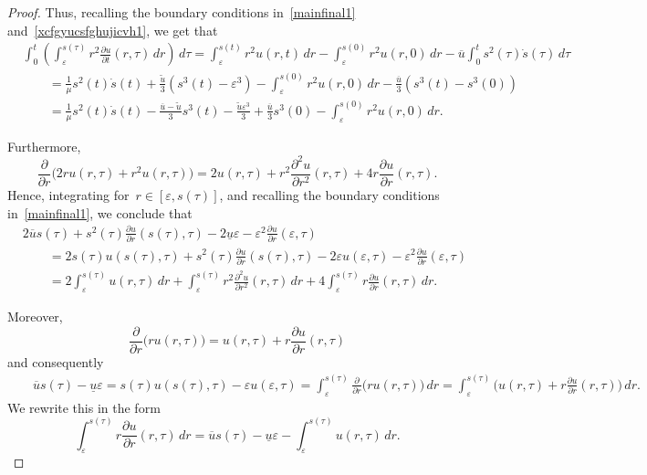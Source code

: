 \documentclass[12pt,a4paper,intlimits,sumlimits]{amsart}
\theoremstyle{definition}
\theoremstyle{plain}
\numberwithin{equation}{section}
\begin{document}
\begin{proof}
Thus, recalling the boundary conditions in~\eqref{mainfinal1} and~\eqref{xcfgyucsfghujicvh1}, we get that
\begin{equation}\label{xcfgyucsfghujicvh2}
\begin{aligned}&
\int_0^t\left(\int_\varepsilon^{s(\tau)}r^2\frac{\partial u}{\partial t}(r,\tau)\, dr\right)\,d\tau=\int_\varepsilon^{s(t)}r^2u(r,t)\,dr-\int_\varepsilon^{s(0)}r^2u(r,0)\,dr-\overline{u}\int_0^ts^2(\tau)\dot s(\tau)\,d\tau \\
&\qquad=\frac{1}{\mu}s^2(t)\dot s(t)+\frac{\widetilde u}{3}(s^3(t)-\varepsilon^3)-\int_\varepsilon^{s(0)}r^2u(r,0)\,dr-\frac{\overline{u}}{3}(s^3(t)-s^3(0)) \\
&\qquad=\frac{1}{\mu}s^2(t)\dot s(t)-\frac{\overline{u}-\widetilde u}{3}s^3(t)-\frac{\widetilde u \varepsilon^3}{3}+\frac{\overline{u}}{3}s^3(0)-\int_\varepsilon^{s(0)}r^2u(r,0)\,dr.
\end{aligned}
\end{equation}

Furthermore,
$$
\frac{\partial}{\partial r}\big( 2r u(r,\tau)+r^2 u(r,\tau)\big)
= 2u(r,\tau)+r^2 \frac{\partial^2u}{\partial r^2}(r,\tau)
+4r\frac{\partial u}{\partial r}(r,\tau).$$
Hence, integrating for~$r\in[\varepsilon,s(\tau)]$,
and recalling the boundary conditions in~\eqref{mainfinal1}, we conclude that
\begin{equation}\label{vfdedfghPASKJdmedf}
\begin{split}
&2\overline u s(\tau)+s^2(\tau) \frac{\partial u}{\partial r}(s(\tau),\tau)
-2\underline u\varepsilon -\varepsilon^2 \frac{\partial u}{\partial r}(\varepsilon,\tau)\\
&\qquad= 2s(\tau) u(s(\tau),\tau)+s^2(\tau) \frac{\partial u}{\partial r}(s(\tau),\tau)
-2\varepsilon u(\varepsilon,\tau)-\varepsilon^2 \frac{\partial u}{\partial r}(\varepsilon,\tau)\\&\qquad= 2\int_\varepsilon^{s(\tau)}u(r,\tau)\,dr+\int_\varepsilon^{s(\tau)}r^2 \frac{\partial^2u}{\partial r^2}(r,\tau)\,dr
+4\int_\varepsilon^{s(\tau)}r\frac{\partial u}{\partial r}(r,\tau)\,dr.
\end{split}\end{equation}

Moreover,
$$ \frac{\partial }{\partial r}\big(ru(r,\tau)\big)=
u(r,\tau)+r\frac{\partial u}{\partial r}(r,\tau)$$
and consequently
\begin{eqnarray*} 
&& \overline u s(\tau)-\underline u\varepsilon=
s(\tau)u(s(\tau),\tau)-\varepsilon u(\varepsilon,\tau)
=\int_\varepsilon^{s(\tau)}\frac{\partial }{\partial r}\big(ru(r,\tau)\big)\,dr=\int_\varepsilon^{s(\tau)}\Big(
u(r,\tau)+r\frac{\partial u}{\partial r}(r,\tau)\Big)\,dr.
\end{eqnarray*}
We rewrite this in the form
$$ \int_\varepsilon^{s(\tau)}r\frac{\partial u}{\partial r}(r,\tau)\,dr=
\overline u s(\tau)-\underline u\varepsilon
-\int_\varepsilon^{s(\tau)}
u(r,\tau)\,dr.$$


\end{proof}
\end{document}
